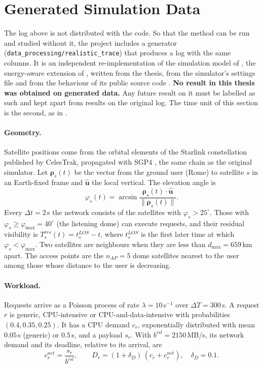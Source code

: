 \section{Generated Simulation Data}
\label{sec:generated-data}
The log above is not distributed with the code. So that the method can be run and studied
without it, the project includes a generator (\texttt{data\_processing/realistic\_trace}) that
produces a log with the same columns. It is an independent re-implementation of the simulation
model of \citet[Chapter~6]{magliarisi2026thesis}, the energy-aware extension of
\citet{magliarisi2025orbit}, written from the thesis, from the simulator's settings file and from
the behaviour of its public source code \citep{cosmos2025}. \textbf{No result in this thesis was
obtained on generated data.} Any future result on it must be labelled as such and kept apart from
results on the original log. The time unit of this section is the second, as in
\citet[Table~6.3]{magliarisi2026thesis}.

\paragraph{Geometry.}
Satellite positions come from the orbital elements of the Starlink constellation published by
CelesTrak, propagated with SGP4 \citep{vallado2006spacetrack}, the same chain as the original
simulator. Let $\boldsymbol\rho_s(t)$ be the vector from the ground user (Rome) to satellite $s$
in an Earth-fixed frame and $\hat{\mathbf u}$ the local vertical. The elevation angle is
\begin{equation}
  \varphi_s(t) = \arcsin\frac{\boldsymbol\rho_s(t)\cdot\hat{\mathbf u}}{\lVert\boldsymbol\rho_s(t)\rVert}.
\end{equation}
Every $\Delta t = 2$\,s the network consists of the satellites with $\varphi_s > 25^\circ$.
Those with $\varphi_s \ge \varphi_{\max} = 40^\circ$ (the listening dome) can execute requests,
and their residual visibility is $T^{res}_s(t) = t^{LOS}_s - t$, where $t^{LOS}_s$ is the first
later time at which $\varphi_s < \varphi_{\max}$. Two satellites are neighbours when they are
less than $d_{\max} = 659$\,km apart. The access points are the $n_{AP} = 5$ dome satellites
nearest to the user among those whose distance to the user is decreasing.

\paragraph{Workload.}
Requests arrive as a Poisson process of rate $\lambda = 10$\,s$^{-1}$ over $\Delta T = 300$\,s.
A request $r$ is generic, CPU-intensive or CPU-and-data-intensive with probabilities
$(0.4, 0.35, 0.25)$. It has a CPU demand $c_r$, exponentially distributed with mean $0.05$\,s
(generic) or $0.5$\,s, and a payload $s_r$. With $b^{isl} = 2150$\,MB/s, its network demand and
its deadline, relative to its arrival, are \citep[Eqs.~6.1--6.2]{magliarisi2026thesis}
\begin{equation}
  c^{net}_r = \frac{s_r}{b^{isl}}, \qquad D_r = (1+\delta_D)\,(c_r + c^{net}_r), \quad \delta_D = 0.1 .
\end{equation}


